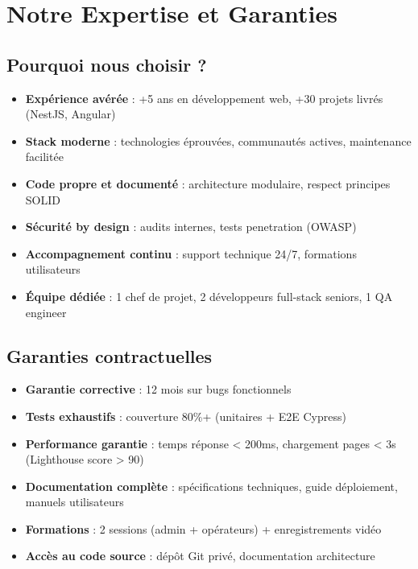 \documentclass[12pt, a4paper]{article}
\begin{document}
\section{Notre Expertise et Garanties}

\subsection{Pourquoi nous choisir ?}

\begin{itemize}[leftmargin=*,noitemsep]
  \item \textbf{Expérience avérée} : +5 ans en développement web, +30 projets livrés (NestJS, Angular)
  \item \textbf{Stack moderne} : technologies éprouvées, communautés actives, maintenance facilitée
  \item \textbf{Code propre et documenté} : architecture modulaire, respect principes SOLID
  \item \textbf{Sécurité by design} : audits internes, tests penetration (OWASP)
  \item \textbf{Accompagnement continu} : support technique 24/7, formations utilisateurs
  \item \textbf{Équipe dédiée} : 1 chef de projet, 2 développeurs full-stack seniors, 1 QA engineer
\end{itemize}

\subsection{Garanties contractuelles}

\begin{itemize}[leftmargin=*,noitemsep]
  \item \textbf{Garantie corrective} : 12 mois sur bugs fonctionnels
  \item \textbf{Tests exhaustifs} : couverture 80\%+ (unitaires + E2E Cypress)
  \item \textbf{Performance garantie} : temps réponse < 200ms, chargement pages < 3s (Lighthouse score > 90)
  \item \textbf{Documentation complète} : spécifications techniques, guide déploiement, manuels utilisateurs
  \item \textbf{Formations} : 2 sessions (admin + opérateurs) + enregistrements vidéo
  \item \textbf{Accès au code source} : dépôt Git privé, documentation architecture
\end{itemize}
\end{document}
